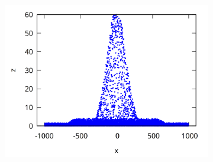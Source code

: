 \begin{figure}
\begin{subfigure}{0.33\textwidth}
\end{subfigure}%
\begin{subfigure}{0.33\textwidth}
    \centering
    \includegraphics[width=1.\textwidth]{img/lateral_160.png}
\end{subfigure}




\end{figure}
